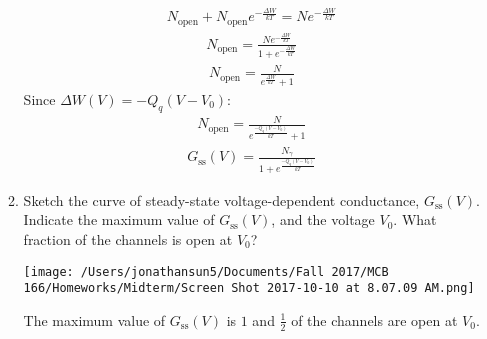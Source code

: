 \documentclass[11pt]{article}
\begin{document}
\begin{enumerate}[label=\arabic*.]
\begin{enumerate}[label=(\alph*)]
\begin{align*}
\end{align*}
\begin{align*}
N_{\text{open}} + N_{\text{open}} e ^ {- \frac{\Delta W} {k T}} = Ne ^ {- \frac{\Delta W} {k T}}
\end{align*}
\begin{align*}
N_{\text{open}} = \frac{Ne ^ {- \frac{\Delta W} {k T}}} {1 + e ^ {- \frac{\Delta W} {k T}}}
\end{align*}
\begin{align*}
N_{\text{open}} = \frac{N} {e ^ {\frac{\Delta W} {k T}} + 1}
\end{align*}
Since $\Delta W(V) = -Q_q(V - V_0)$:
\begin{align*}
N_{\text{open}} = \frac{N} {e ^ {\frac{-Q_q(V - V_0)} {k T}} + 1}
\end{align*}
\begin{align*}
G_{\text{ss}}(V) = \frac{N_{\gamma}} {1 + e ^ {\frac{-Q_q(V - V_0)} {k T}}}
\end{align*}



\newpage
\item
Sketch the curve of steady-state voltage-dependent conductance, $G_{\text{ss}}(V)$. Indicate the maximum value of $G_{\text{ss}}(V)$, and the voltage $V_0$. What fraction of the channels is open at $V_0$?
\begin{center}
\texttt{[image: /Users/jonathansun5/Documents/Fall 2017/MCB 166/Homeworks/Midterm/Screen Shot 2017-10-10 at 8.07.09 AM.png]}
\end{center}
The maximum value of $G_{\text{ss}}(V)$ is $1$ and $\frac{1} {2}$ of the channels are open at $V_0$.




\end{enumerate}
\end{enumerate}
\end{document}
